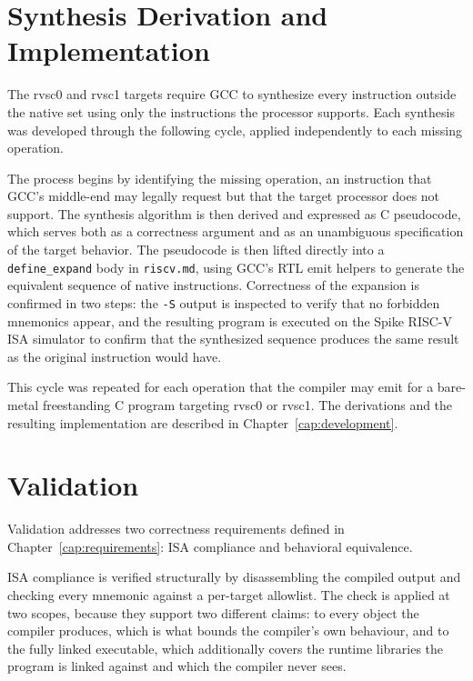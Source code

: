 \section{Synthesis Derivation and Implementation}

The rvsc0 and rvsc1 targets require GCC to synthesize every instruction outside the native set using
only the instructions the processor supports. Each synthesis was developed through the following cycle,
applied independently to each missing operation.

The process begins by identifying the missing operation, an instruction that GCC's middle-end may
legally request but that the target processor does not support. The synthesis algorithm is then derived
and expressed as C pseudocode, which serves both as a correctness argument and as an unambiguous
specification of the target behavior. The pseudocode is then lifted directly into a
\texttt{define\_expand} body in \texttt{riscv.md}, using GCC's RTL emit helpers to generate the
equivalent sequence of native instructions. Correctness of the expansion is confirmed in two steps:
the \texttt{-S} output is inspected to verify that no forbidden mnemonics appear, and the resulting
program is executed on the Spike RISC-V ISA simulator \cite{spike} to confirm that the synthesized
sequence produces the same result as the original instruction would have.

This cycle was repeated for each operation that the compiler may emit for a bare-metal freestanding C
program targeting rvsc0 or rvsc1. The derivations and the resulting implementation are described in
Chapter~\ref{cap:development}.

\section{Validation}

Validation addresses two correctness requirements defined in Chapter~\ref{cap:requirements}: ISA
compliance and behavioral equivalence.

ISA compliance is verified structurally by disassembling the compiled output and checking every
mnemonic against a per-target allowlist. The check is applied at two scopes, because they support two
different claims: to every object the compiler produces, which is what bounds the compiler's own
behaviour, and to the fully linked executable, which additionally covers the runtime libraries the
program is linked against and which the compiler never sees.

